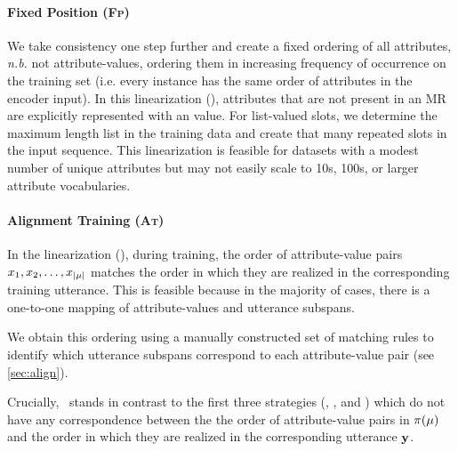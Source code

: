 \paragraph{Fixed Position (\textsc{Fp})} We take  consistency one step further
and create a fixed ordering of all attributes, \textit{n.b.} not
attribute-values, ordering them in increasing frequency of occurrence on the
training set (i.e. every instance has the same order of attributes in the
encoder input). In this  linearization (),
attributes that are not present in an MR are explicitly represented with an
 value.  For list-valued slots, we determine the maximum length
list in the training data and create that many repeated slots in the input
sequence.  This linearization is feasible for datasets with a modest number of
unique attributes %
but may 
not easily scale to 10s, 100s, or larger attribute vocabularies. 

\paragraph{Alignment Training (\textsc{At})} 

In the  linearization (), during
training, the order of attribute-value pairs $x_1, x_2, \ldots,
x_{{\lvert \mu \rvert}}$ matches the order in which they are realized in the
corresponding training utterance.  This is feasible because in the majority of
cases, there is a one-to-one mapping of attribute-values and utterance
subspans.


We obtain this ordering using a manually constructed set of matching rules to
identify which utterance subspans correspond to each attribute-value pair
(see \autoref{sec:align}).

Crucially, ~stands in contrast to the  first three strategies
(, , and ) which do not have any
correspondence between the the order of attribute-value pairs in $\pi(\mu)$
and the order in which they are realized in the corresponding utterance
$\mathbf{y}$. %




